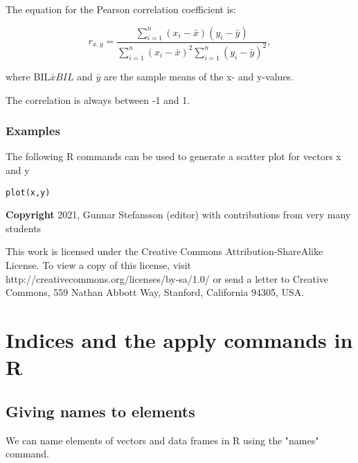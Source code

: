 \documentclass[12pt,a4paper]{article}
\theoremstyle{regla}
\theoremstyle{remark}
\theoremstyle{definition}
\theoremstyle{nonumberbreak}
\begin{document}
The equation for the Pearson correlation coefficient is:  

$$
r_{x,y} = \frac{\sum_{i=1}^{n}(x_i - \bar{x})(y_i - \bar{y})}{\sum_{i=1}^{n}(x_i - \bar{x})^2\sum_{i=1}^{n}(y_i - \bar{y})^2}, 
$$

where BIL$\bar{x}BIL$ and $\bar{y}$ are the sample means of the x- and y-values.

The correlation is always between -1 and 1. 

\subsubsection{Examples}
The following R commands can be used to generate a scatter plot for vectors x and y
\begin{xmpl}
\begin{lstlisting}
plot(x,y) 
\end{lstlisting}
\end{xmpl}

{\bf Copyright}
2021, Gunnar Stefansson (editor) with contributions from very many students

This work is licensed under the Creative Commons
Attribution-ShareAlike License. To view a copy of this license, visit
http://creativecommons.org/licenses/by-sa/1.0/ or send a letter to
Creative Commons, 559 Nathan Abbott Way, Stanford, California 94305,
USA.
\clearpage
\section{Indices and the apply commands in R}
\subsection{Giving names to elements}
\begin{fbox}
\begin{minipage}{0.97\textwidth}
We can name elements of vectors and data frames in R using the "names" command.




\end{minipage}
\end{fbox}
\end{document}
